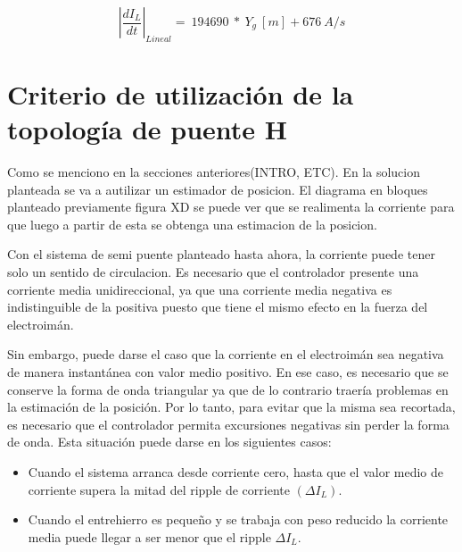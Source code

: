 \begin{equation} \label{eq_di-dt_lineal}
{\left|\frac{{dI}_L}{dt}\right|}_{Lineal}=\ 194690\ *\ Y_g\:[m]+676\:A/s
\end{equation}

\section{Criterio de utilización de la topología de puente H}
\label{secc_justificación-puente-H}

Como se menciono en la secciones anteriores(INTRO, ETC). En la solucion planteada se va a autilizar un estimador de posicion. El diagrama en bloques planteado previamente figura XD se puede ver que se realimenta la corriente para que luego a partir de esta se obtenga una estimacion de la posicion.


Con el sistema de semi puente planteado hasta ahora, la corriente puede tener solo un sentido de circulacion. Es necesario que el controlador presente una corriente media unidireccional, ya que una corriente media negativa es indistinguible de la positiva puesto que tiene el mismo efecto en la fuerza del electroimán.%

Sin embargo, puede darse el caso que la corriente en el electroimán sea negativa de manera instantánea con valor medio positivo. En ese caso, es necesario que se conserve la forma de onda triangular ya que de lo contrario traería problemas en la estimación de la posición. Por lo tanto, para evitar que la misma sea recortada, es necesario que el controlador permita excursiones negativas sin perder la forma de onda. Esta situación puede darse en los siguientes casos:


\begin{itemize} 
	\item Cuando el sistema arranca desde corriente cero, hasta que el valor medio de corriente supera la mitad del ripple de corriente $(\Delta I_{L})$.
	
	\item Cuando el entrehierro es pequeño y se trabaja con peso reducido la corriente media puede llegar a ser menor que el ripple $\Delta I_{L}$.
\end{itemize}

